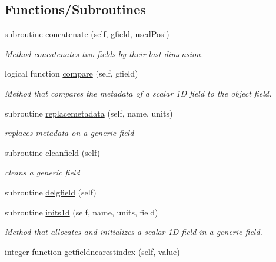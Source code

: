 \subsection*{Functions/\+Subroutines}
\begin{DoxyCompactItemize}
\item 
subroutine \mbox{\hyperlink{namespacefieldtypes__mod_a67cc0dfdc7206a2769746ff7879a4375}{concatenate}} (self, gfield, used\+Posi)
\begin{DoxyCompactList}\small\item\em Method concatenates two fields by their last dimension. \end{DoxyCompactList}\item 
logical function \mbox{\hyperlink{namespacefieldtypes__mod_aad356f6f10d8edc58c56f02c796423f3}{compare}} (self, gfield)
\begin{DoxyCompactList}\small\item\em Method that compares the metadata of a scalar 1D field to the object field. \end{DoxyCompactList}\item 
subroutine \mbox{\hyperlink{namespacefieldtypes__mod_ad8f3bf57dafb3eac18e5a3198e36047c}{replacemetadata}} (self, name, units)
\begin{DoxyCompactList}\small\item\em replaces metadata on a generic field \end{DoxyCompactList}\item 
subroutine \mbox{\hyperlink{namespacefieldtypes__mod_a1d491079d69fb297c4fedd4f37d85e8e}{cleanfield}} (self)
\begin{DoxyCompactList}\small\item\em cleans a generic field \end{DoxyCompactList}\item 
subroutine \mbox{\hyperlink{namespacefieldtypes__mod_a4ec7b627804dfcdf20e3374ecc1cf459}{delgfield}} (self)
\item 
subroutine \mbox{\hyperlink{namespacefieldtypes__mod_a3f1571ad15733a3f2fff43e35f309416}{inits1d}} (self, name, units, field)
\begin{DoxyCompactList}\small\item\em Method that allocates and initializes a scalar 1D field in a generic field. \end{DoxyCompactList}\item 
integer function \mbox{\hyperlink{namespacefieldtypes__mod_afad53b4aed8733a243672c2dc19f62f3}{getfieldnearestindex}} (self, value)

\end{DoxyCompactItemize}
